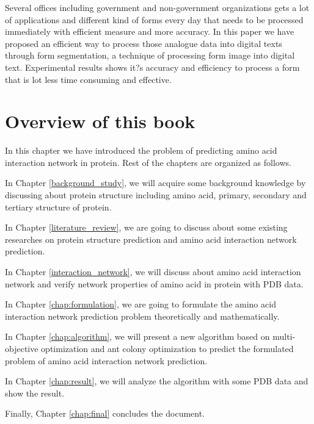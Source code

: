 Several offices including government and non-government organizations gets a lot of applications and different kind of forms every day that needs to be processed immediately with efficient measure and more accuracy. 
In this paper we have proposed an efficient way to process those analogue data into digital texts through form segmentation, a technique of processing form image into digital text. Experimental results shows it?s accuracy and efficiency to process a form that is lot less time consuming and effective.  

\section{Overview of this book}
In this chapter we have introduced the problem of predicting amino acid interaction network in protein. Rest of the chapters are organized as follows.

In Chapter \ref{background_study}, we will acquire some background knowledge by discussing about protein structure including amino acid, primary, secondary and tertiary structure of protein.

In Chapter \ref{literature_review}, we are going to discuss about some existing researches on protein structure prediction and amino acid interaction network prediction.

In Chapter \ref{interaction_network}, we will discuss about amino acid interaction network and verify network properties of amino acid in protein with PDB data.

In Chapter \ref{chap:formulation}, we are going to formulate the amino acid interaction network prediction problem theoretically and mathematically. 

In Chapter \ref{chap:algorithm}, we will present a new algorithm based on multi-objective optimization and ant colony optimization to predict the formulated problem of amino acid interaction network prediction.

In Chapter \ref{chap:result}, we will analyze the algorithm with some PDB data and show the result.

Finally, Chapter \ref{chap:final} concludes the document.

